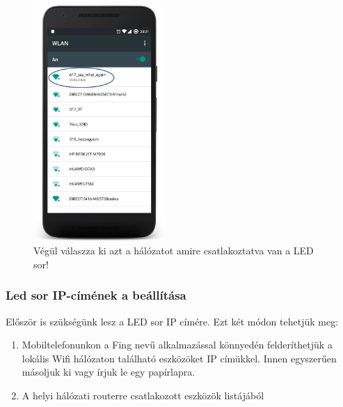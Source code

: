 \documentclass[../main.tex]{subfiles}
\begin{document}
            \begin{figure}[!h]
                \centering
                \includegraphics[width=5cm]{android_res/screen_pictures/wifi_err_03.png}
                \caption{Végül válaszza ki azt a hálózatot amire csatlakoztatva van a LED sor!}
                \label{fig:wifi_err_03}
            \end{figure}
        
        \subsubsection{Led sor IP-címének a beállítása}
            Először is szükségünk lesz a LED sor IP címére. Ezt két módon tehetjük meg:
            
            \begin{enumerate}
                \item Mobiltelefonunkon a Fing nevű alkalmazással könnyedén felderíthetjük a lokális Wifi hálózaton található eszközöket IP címükkel. Innen egyszerűen másoljuk ki vagy írjuk le egy papírlapra.
                \item A helyi hálózati routerre csatlakozott eszközök listájából
            \end{enumerate}
            
\end{document}
